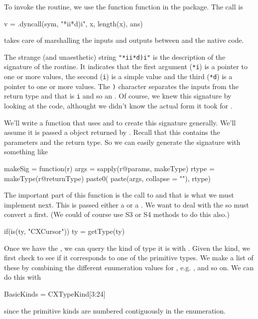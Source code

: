To invoke the routine, we use the function  function
in the  package. 
The call is 
\begin{RCode}
v = .dyncall(sym, "*ii*d)i", x, length(x), ans)
\end{RCode}
 takes care of marshalling the inputs and outputs
between \R{} and the native code.

The strange (and unaesthetic) string \verb+"*ii*d)i"+ is the
description of the signature of the routine.  It indicates that the
first argument (\verb+*i+) is a pointer to one or more 
values, the second (\verb+i+) is a simple  value and the
third (\verb+*d+) is a pointer to one or more  values.
The \verb+)+ character separates the inputs from the return type and
that is \verb+i+ and so an .  Of course, we knew this
signature by looking at the code, althought we didn't know the actual
form it took for .

We'll write a function that uses \libclang{} and  to
create this signature generally.  We'll assume it is passed a
 object returned by .
Recall that this contains the parameters and the return type.
So we can easily generate the signature with something like
\begin{RCode}
makeSig = 
function(r)
{
   args = sapply(r@params, makeType)
   rtype = makeType(r@returnType)
   paste0( paste(args, collapse = ""), rtype)
}
\end{RCode}
The important part of this function is the call to 
and that is what we must implement next.
This is passed  either a  or a .
We want to deal with the  so must convert a
 first. (We could of course use S3 or S4 methods to
do this also.)
\begin{RCode}
   if(is(ty, "CXCursor"))
     ty = getType(ty)
\end{RCode}
Once we have the , we can query the kind of type it is
with .
Given the kind, we first check to see if it corresponds to one of the
primitive types. We make a list of these by combining
the different enumeration values for , e.g. 
,  and so on.
We can do this with
\begin{RCode}
BasicKinds = CXTypeKind[3:24]
\end{RCode}
since the primitive kinds are numbered contiguously in the
enumeration.


